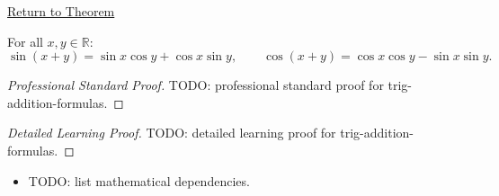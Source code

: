 \newpage
{}
\label{prf:trig-addition-formulas}

\begin{remark*}[Return]
\hyperref[prop:trig-addition-formulas]{Return to Theorem}
\end{remark*}

\begin{proposition*}
For all $x, y \in \mathbb{R}$:
\[
  \sin(x+y) = \sin x \cos y + \cos x \sin y,
  \qquad
  \cos(x+y) = \cos x \cos y - \sin x \sin y.
\]

\smallskip\noindent
\end{proposition*}

\begin{proof}[Professional Standard Proof]
\LRAProofBodyStart
TODO: professional standard proof for trig-addition-formulas.
\end{proof}

\begin{proof}[Detailed Learning Proof]
\LRAProofBodyStart
TODO: detailed learning proof for trig-addition-formulas.
\end{proof}

\begin{remark*}
\end{remark*}

\begin{dependencies}
\begin{itemize}
  \item TODO: list mathematical dependencies.
\end{itemize}
\end{dependencies}

\clearpage

